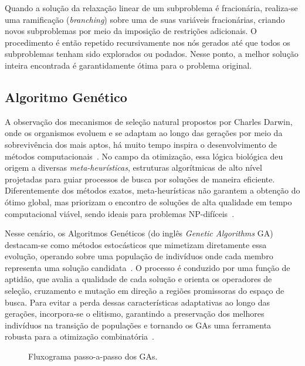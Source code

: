 \documentclass[11pt]{article}
\begin{document}
Quando a solução da relaxação linear de um subproblema é fracionária, realiza-se uma ramificação (\emph{branching}) sobre uma de suas variáveis fracionárias, criando novos subproblemas por meio da imposição de restrições adicionais. O procedimento é então repetido recursivamente nos nós gerados até que todos os subproblemas tenham sido explorados ou podados. Nesse ponto, a melhor solução inteira encontrada é garantidamente ótima para o problema original.





\subsection{Algoritmo Genético}

A observação dos mecanismos de seleção natural propostos por Charles Darwin, onde os organismos evoluem e se adaptam ao longo das gerações por meio da sobrevivência dos mais aptos, há muito tempo inspira o desenvolvimento de métodos computacionais~\cite{Sivanandam2007}. No campo da otimização, essa lógica biológica deu origem a diversas \emph{meta-heurísticas}, estruturas algorítmicas de alto nível projetadas para guiar processos de busca por soluções de maneira eficiente. Diferentemente dos métodos exatos, meta-heurísticas não garantem a obtenção do ótimo global, mas priorizam o encontro de soluções de alta qualidade em tempo computacional viável, sendo ideais para problemas NP-difíceis~\cite{Metaheuristics}.

Nesse cenário, os Algoritmos Genéticos (do inglês \emph{Genetic Algorithms} GA) destacam-se como métodos estocásticos que mimetizam diretamente essa evolução, operando sobre uma população de indivíduos onde cada membro representa uma solução candidata~\cite{Sivanandam2007}. O processo é conduzido por uma função de aptidão, que avalia a qualidade de cada solução e orienta os operadores de seleção, cruzamento e mutação em direção a regiões promissoras do espaço de busca. Para evitar a perda dessas características adaptativas ao longo das gerações, incorpora-se o elitismo, garantindo a preservação dos melhores indivíduos na transição de populações e tornando os GAs uma ferramenta robusta para a otimização combinatória~\cite{Khandelwal2021,Aggarwal2024,Raju2024}.


    \begin{figure}[H]
        \centering
        \scalebox{0.55}{\fluxograma}
        \caption{Fluxograma passo-a-passo dos GAs.}
        \label{fig:fluxograma_ga}
    \end{figure}
\end{document}
